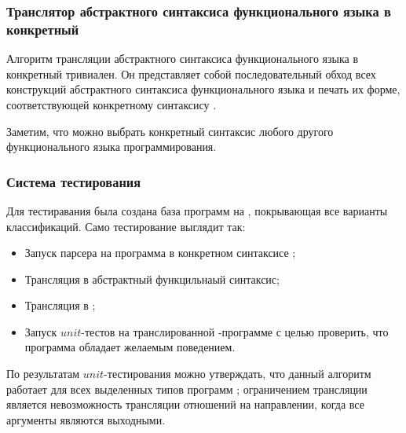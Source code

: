 
\subsubsection{Транслятор абстрактного синтаксиса функционального языка в конкретный}

Алгоритм трансляции абстрактного синтаксиса функционального языка в конкретный тривиален.
Он представляет собой последовательный обход всех конструкций абстрактного синтаксиса функционального языка и печать их форме, соответствующей конкретному синтаксису \haskell{}.

Заметим, что можно выбрать конкретный синтаксис любого другого функционального языка программирования.


\subsubsection{Система тестирования}

Для тестиравания была создана база программ на \miniKanren{}, покрывающая все варианты классификаций.
Само тестирование выглядит так:
\begin{itemize}
    \item Запуск парсера на программа в конкретном синтаксисе \miniKanren{};
    \item Трансляция в абстрактный функцильнаый синтаксис;
    \item Трансляция в \haskell{};
    \item Запуск $unit$-тестов на транслированной \haskell{}-программе с целью проверить, что программа обладает желаемым поведением.
\end{itemize}

По результатам $unit$-тестирования можно утверждать, что данный алгоритм работает для всех выделенных типов программ \miniKanren{}; ограничением трансляции является невозможность трансляции отношений на направлении, когда все аргументы являются выходными.